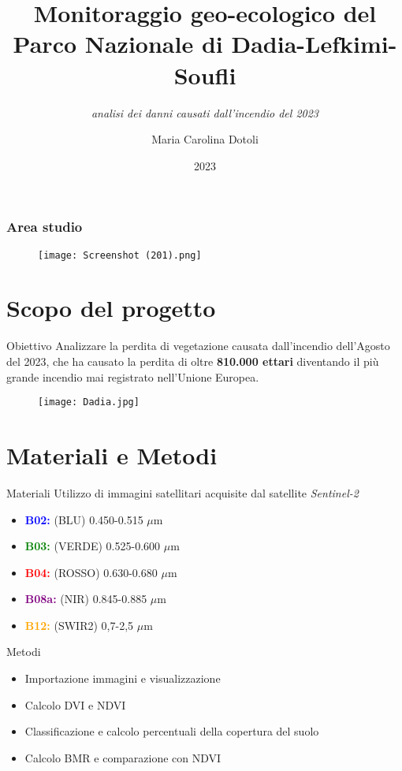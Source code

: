 \documentclass{beamer}
\title{Monitoraggio geo-ecologico del Parco Nazionale di Dadia-Lefkimi-Soufli}
\subtitle{\textit{analisi dei danni causati dall'incendio del 2023}}
\author{Maria Carolina Dotoli}
\institute{Alma Mater Studiorum - Università di Bologna}
\date{2023}
\begin{document}
\maketitle


\begin{frame}
\frametitle{\textbf{Area studio}}
\begin{figure}
    \centering
    \texttt{[image: Screenshot (201).png]}
\end{figure}
 \end{frame}
 \section{Scopo del progetto}

\begin{frame}{Obiettivo}
    Analizzare la perdita di vegetazione causata dall'incendio dell'Agosto del 2023, che ha causato la perdita di oltre \textbf{810.000 ettari} diventando il più grande incendio mai registrato nell'Unione Europea.
    \begin{figure}
        \centering
        \texttt{[image: Dadia.jpg]}
    \end{figure}
\end{frame}

\section{Materiali e Metodi}

\begin{frame}{Materiali}
Utilizzo di immagini satellitari acquisite dal satellite \textit{Sentinel-2}
\begin{itemize}[topsep=22pt]
    \item \textbf{\textcolor{blue}{B02:}} (BLU) 0.450-0.515 $\mu$m\
    \item \textbf{\textcolor{green}{B03:}} (VERDE) 0.525-0.600 $\mu$m\
    \item \textbf{\textcolor{red}{B04:}} (ROSSO) 0.630-0.680 $\mu$m\
    \item \textbf{\textcolor{purple}{B08a:}} (NIR) 0.845-0.885 $\mu$m\
    \item \textbf{\textcolor{orange}{B12:}} (SWIR2)  0,7-2,5 $\mu$m\
\end{itemize}
\end{frame}


\begin{frame}{Metodi}
    \begin{itemize}
        \item Importazione immagini e visualizzazione
        \item \pause Calcolo DVI e NDVI
        \item  \pause Classificazione e calcolo percentuali della copertura del suolo 
         \item \pause Calcolo BMR e comparazione con NDVI
        
    \end{itemize}

\end{frame}
\end{document}
